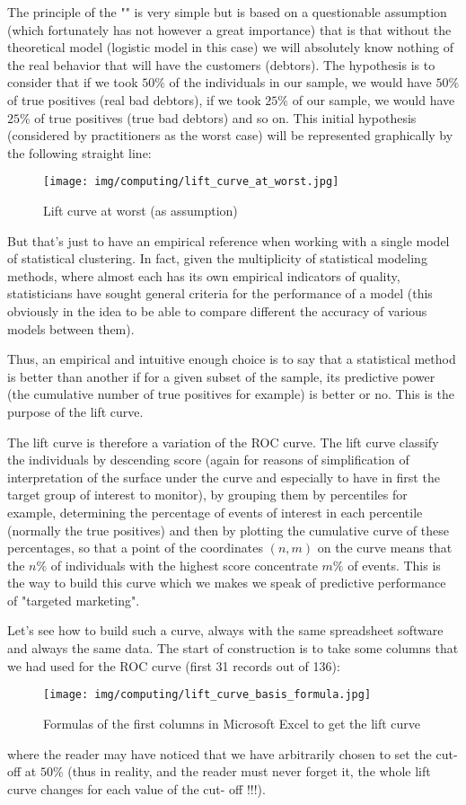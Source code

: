 	The principle of the "" is very simple but is based on a questionable assumption (which fortunately has not however a great importance) that is that without the theoretical model (logistic model in this case) we will absolutely know nothing of the real behavior that will have the customers (debtors). The hypothesis is to consider that if we took $50\%$ of the individuals in our sample, we would have $50\%$ of true positives (real bad debtors), if we took $25\%$ of our sample, we would have $25\%$ of true positives (true bad debtors) and so on. This initial hypothesis (considered by practitioners as the worst case) will be represented graphically by the following straight line:
	\begin{figure}[H]
		\centering
		\texttt{[image: img/computing/lift\_curve\_at\_worst.jpg]}
		\caption[]{Lift curve at worst (as assumption)}
	\end{figure}
	But that's just to have an empirical reference when working with a single model of statistical clustering. In fact, given the multiplicity of statistical modeling methods, where almost each has its own empirical indicators of quality, statisticians have sought general criteria for the performance of a model (this obviously in the idea to be able to compare different the accuracy of various models between them).
	
	Thus, an empirical and intuitive enough choice is to say that a statistical method is better than another if for a given subset of the sample, its predictive power (the cumulative number of true positives for example) is better or no. This is the purpose of the lift curve.
	
	The lift curve is therefore a variation of the ROC curve. The lift curve classify the individuals by descending score (again for reasons of simplification of interpretation of the surface under the curve and especially to have in first the target group of interest to monitor), by grouping them by percentiles for example, determining the percentage of events of interest in each percentile (normally the true positives) and then by plotting the cumulative curve of these percentages, so that a point of the coordinates $(n, m)$ on the curve means that the $n\%$ of individuals with the highest score concentrate $m\%$ of events. This is the way to build this curve which we makes we speak of predictive performance of "targeted marketing".
	
	Let's see how to build such a curve, always with the same spreadsheet software and always the same data. The start of construction is to take some columns that we had used for the ROC curve (first 31 records out of 136):
	\begin{figure}[H]
		\centering
		\texttt{[image: img/computing/lift\_curve\_basis\_formula.jpg]}
		\caption[]{Formulas of the first columns in Microsoft Excel to get the lift curve}
	\end{figure}
	where the reader may have noticed that we have arbitrarily chosen to set the cut-off at $50\%$ (thus in reality, and the reader must never forget it, the whole lift curve changes for each value of the cut- off !!!).
	
